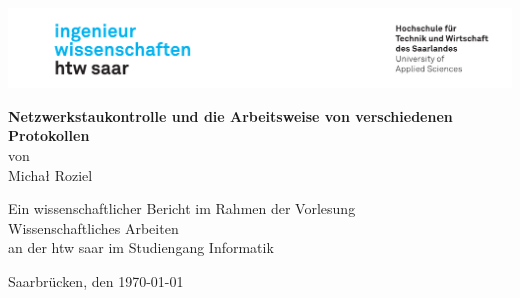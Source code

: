 \begin{titlepage}

\linespread{1.5}

\includegraphics[width=\linewidth]{graphics/htw_logo}

\begin{center}
    \large  
    \hfill
    \vfill
    \Large{\bfseries{Netzwerkstaukontrolle und die Arbeitsweise von verschiedenen Protokollen}}\\
    
    von \\
    Michał Roziel

    \vfill
		
    Ein wissenschaftlicher Bericht im Rahmen der Vorlesung\\
    \glqq Wissenschaftliches Arbeiten\grqq\\
    an der htw saar im Studiengang Informatik\\
	
    \vfill	
    \vfill
	
    Saarbrücken, den \today
\end{center}
    
\end{titlepage}
